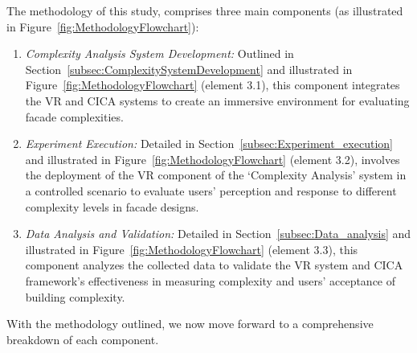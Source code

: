 The methodology of this study, comprises three main components (as illustrated in  Figure~\ref{fig:MethodologyFlowchart}):
\begin{enumerate}
    \item \textit{Complexity Analysis System Development:}  Outlined in Section~\ref{subsec:ComplexitySystemDevelopment} and illustrated in Figure~\ref{fig:MethodologyFlowchart} (element 3.1), this component integrates the VR and CICA systems to create an immersive environment for evaluating facade complexities.
    \item \textit{Experiment Execution:} Detailed in Section~\ref{subsec:Experiment_execution} and illustrated in Figure~\ref{fig:MethodologyFlowchart} (element 3.2), involves the deployment of the VR component of the `Complexity Analysis' system in a controlled scenario to evaluate users' perception and response to different complexity levels in facade designs.
    \item \textit{Data Analysis and Validation:} Detailed in Section~\ref{subsec:Data_analysis} and illustrated in Figure~\ref{fig:MethodologyFlowchart} (element 3.3), this component analyzes the collected data to validate the VR system and CICA framework's effectiveness in measuring complexity and users' acceptance of building complexity.
\end{enumerate}

With the methodology outlined, we now move forward to a comprehensive breakdown of each component.


